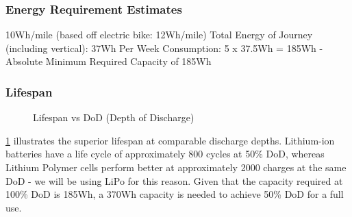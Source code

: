 \documentclass[journal,10pt]{IEEEtran}
\begin{document}
        \subsubsection{Energy Requirement Estimates}
            10Wh/mile (based off electric bike: 12Wh/mile)
            Total Energy of Journey (including vertical): 37Wh
            Per Week Consumption: 5 x 37.5Wh = 185Wh
            -Absolute Minimum Required Capacity of 185Wh
        \subsubsection{Lifespan}
            \begin{figure}[H]
                \centering
                \caption{Lifespan vs DoD (Depth of Discharge)}
                \label{fig:DoD}
            \end{figure}
            \cite{BatteryLifespan} 
            \ref{fig:DoD} illustrates the superior lifespan at comparable discharge depths.
            Lithium-ion batteries have a life cycle of approximately 800 cycles at 50\% DoD, whereas Lithium Polymer cells perform better at approximately 2000 charges at the same DoD - we will be using LiPo for this reason. Given that the capacity required at 100\% DoD is 185Wh, a 370Wh capacity is needed to achieve 50\% DoD for a full use.
\end{document}

